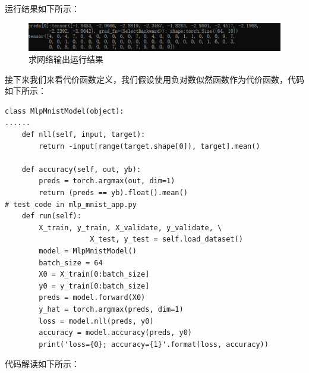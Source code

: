 \documentclass[UTF8]{article}
\begin{document}
运行结果如下所示：
\begin{figure}[H]
	\caption{求网络输出运行结果}
	\label{f000081}
	\centering
	\includegraphics[width=15cm]{images/f000081}
\end{figure}
接下来我们来看代价函数定义，我们假设使用负对数似然函数作为代价函数，代码如下所示：
\begin{lstlisting}
class MlpMnistModel(object):
......
    def nll(self, input, target):
        return -input[range(target.shape[0]), target].mean()
        
    def accuracy(self, out, yb):
        preds = torch.argmax(out, dim=1)
        return (preds == yb).float().mean()
# test code in mlp_mnist_app.py      
    def run(self):
        X_train, y_train, X_validate, y_validate, \
                    X_test, y_test = self.load_dataset()
        model = MlpMnistModel()
        batch_size = 64
        X0 = X_train[0:batch_size]
        y0 = y_train[0:batch_size]
        preds = model.forward(X0)
        y_hat = torch.argmax(preds, dim=1)
        loss = model.nll(preds, y0)
        accuracy = model.accuracy(preds, y0)
        print('loss={0}; accuracy={1}'.format(loss, accuracy))
\end{lstlisting}
代码解读如下所示：
\end{document}
